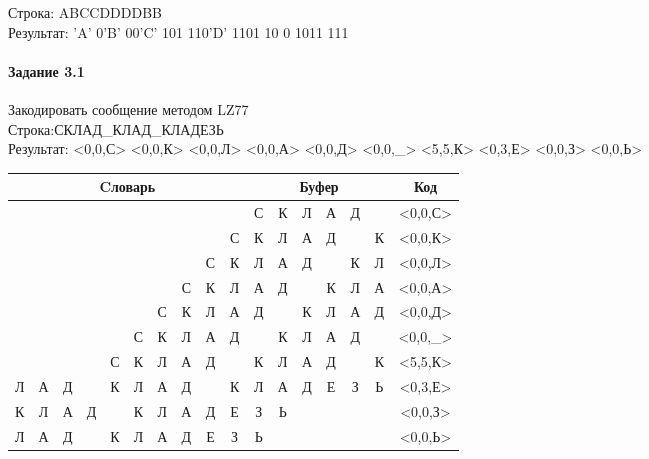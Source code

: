 \documentclass[a4paper, 12pt]{article}
\begin{document}
Строка: 
ABCCDDDDBB\\
Результат: 'A' 0'B' 00'C' 101 110'D' 1101 10 0 1011 111










\pagebreak
\paragraph{Задание 3.1}

Закодировать сообщение методом LZ77\\
Строка:СКЛАД\_КЛАД\_КЛАДЕЗЬ\\
Результат: <0,0,С> <0,0,К> <0,0,Л> <0,0,А> <0,0,Д> <0,0,\_> <5,5,К> <0,3,Е> <0,0,З> <0,0,Ь>\\
\begin{table}[h!]
\centering
\begin{tabular}{|c|c|c|c|c|c|c|c|c|c|c|c|c|c|c|c|c|} 
\hline
\multicolumn{10}{|c|}{Cловарь} & \multicolumn{6}{c|}{Буфер} & Код  \\ \hline
  &   &   &   &   &   &   &   &   &   & \cellcolor[HTML]{8CE4F6} С & К & Л & А & Д &   & <0,0,С>
\\ \hline
  &   &   &   &   &   &   &   &   & С & \cellcolor[HTML]{8CE4F6} К & Л & А & Д &   & К & <0,0,К>
\\ \hline
  &   &   &   &   &   &   &   & С & К & \cellcolor[HTML]{8CE4F6} Л & А & Д &   & К & Л & <0,0,Л>
\\ \hline
  &   &   &   &   &   &   & С & К & Л & \cellcolor[HTML]{8CE4F6} А & Д &   & К & Л & А & <0,0,А>
\\ \hline
  &   &   &   &   &   & С & К & Л & А & \cellcolor[HTML]{8CE4F6} Д &   & К & Л & А & Д & <0,0,Д>
\\ \hline
  &   &   &   &   & С & К & Л & А & Д & \cellcolor[HTML]{8CE4F6}   & К & Л & А & Д &   & <0,0,\_>
\\ \hline
  &   &   &   & С & \cellcolor[HTML]{FFFF00} К & \cellcolor[HTML]{FFFF00} Л & \cellcolor[HTML]{FFFF00} А & \cellcolor[HTML]{FFFF00} Д & \cellcolor[HTML]{FFFF00}   & \cellcolor[HTML]{FFFF00} К & \cellcolor[HTML]{FFFF00} Л & \cellcolor[HTML]{FFFF00} А & \cellcolor[HTML]{FFFF00} Д & \cellcolor[HTML]{FFFF00}   & \cellcolor[HTML]{8CE4F6} К & <5,5,К>
\\ \hline
\cellcolor[HTML]{FFFF00} Л & \cellcolor[HTML]{FFFF00} А & \cellcolor[HTML]{FFFF00} Д &   & К & Л & А & Д &   & К & \cellcolor[HTML]{FFFF00} Л & \cellcolor[HTML]{FFFF00} А & \cellcolor[HTML]{FFFF00} Д & \cellcolor[HTML]{8CE4F6} Е & З & Ь & <0,3,Е>
\\ \hline
К & Л & А & Д &   & К & Л & А & Д & Е & \cellcolor[HTML]{8CE4F6} З & Ь &   &   &   &   & <0,0,З>
\\ \hline
Л & А & Д &   & К & Л & А & Д & Е & З & \cellcolor[HTML]{8CE4F6} Ь &   &   &   &   &   & <0,0,Ь>
\\ \hline
\end{tabular}
\end{table}
\end{document}
